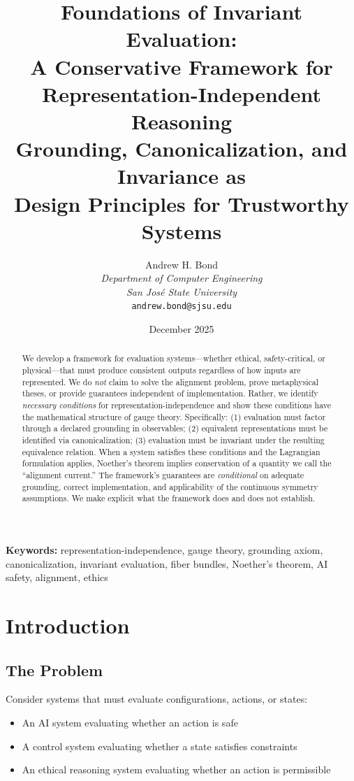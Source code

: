 \documentclass[12pt]{article}
\title{\textbf{Foundations of Invariant Evaluation:\\
A Conservative Framework for\\
Representation-Independent Reasoning}\\[10pt]
\large Grounding, Canonicalization, and Invariance as\\
Design Principles for Trustworthy Systems}
\author{Andrew H. Bond\\
\textit{Department of Computer Engineering}\\
\textit{San Jos\'{e} State University}\\
\texttt{andrew.bond@sjsu.edu}}
\date{December 2025}
\theoremstyle{definition}
\theoremstyle{remark}
\begin{document}
\maketitle

\noindent\textbf{Keywords:} representation-independence, gauge theory, grounding axiom, canonicalization, invariant evaluation, fiber bundles, Noether's theorem, AI safety, alignment, ethics

\begin{abstract}
We develop a framework for evaluation systems---whether ethical, safety-critical, or
physical---that must produce consistent outputs regardless of how inputs are represented.
We do \emph{not} claim to solve the alignment problem, prove metaphysical theses, or provide
guarantees independent of implementation. Rather, we identify \emph{necessary conditions} for
representation-independence and show these conditions have the mathematical structure
of gauge theory. Specifically: (1) evaluation must factor through a declared grounding in
observables; (2) equivalent representations must be identified via canonicalization; (3) evaluation must be invariant under the resulting equivalence relation. When a system satisfies
these conditions and the Lagrangian formulation applies, Noether's theorem implies conservation of a quantity we call the ``alignment current.'' The framework's guarantees are
\emph{conditional} on adequate grounding, correct implementation, and applicability of the continuous symmetry assumptions. We make explicit what the framework does and does not
establish.
\end{abstract}

\tableofcontents

\newpage

\section{Introduction}

\subsection{The Problem}

Consider systems that must evaluate configurations, actions, or states:

\begin{itemize}
    \item An AI system evaluating whether an action is safe
    \item A control system evaluating whether a state satisfies constraints
    \item An ethical reasoning system evaluating whether an action is permissible
\end{itemize}
\end{document}
